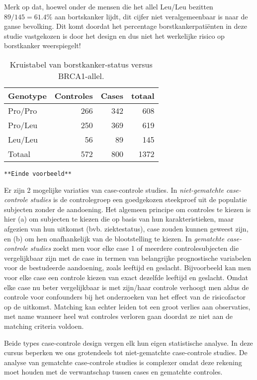 \documentclass[12pt,dutch,coursenotes]{book}
\theoremstyle{definition}
\theoremstyle{definition}
\theoremstyle{definition}
\theoremstyle{remark}
\begin{document}
Merk op dat, hoewel onder de mensen die het allel Leu/Leu bezitten
\(89/145=61.4\%\) aan bortskanker lijdt, dit cijfer niet veralgemeenbaar
is naar de ganse bevolking. Dit komt doordat het percentage
borstkankerpatiënten in deze studie vastgekozen is door het design en
dus niet het werkelijke risico op borstkanker weerspiegelt!

\begin{table}[t]

\caption{\label{tab:leu}Kruistabel van borstkanker-status versus BRCA1-allel.}
\centering
\begin{tabular}{lrrr}
\toprule
Genotype & Controles & Cases & totaal\\
\midrule
Pro/Pro & 266 & 342 & 608\\
Pro/Leu & 250 & 369 & 619\\
Leu/Leu & 56 & 89 & 145\\
Totaal & 572 & 800 & 1372\\
\bottomrule
\end{tabular}
\end{table}

\texttt{**Einde\ voorbeeld**}

Er zijn 2 mogelijke variaties van case-controle studies. In
\emph{niet-gematchte case-controle studies} is de controlegroep een
goedgekozen steekproef uit de populatie subjecten zonder de aandoening.
Het algemeen principe om controles te kiezen is hier (a) om subjecten te
kiezen die op basis van hun karakteristieken, maar afgezien van hun
uitkomst (bvb. ziektestatus), case zouden kunnen geweest zijn, en (b) om
hen onafhankelijk van de blootstelling te kiezen. In \emph{gematchte
case-controle studies} zoekt men voor elke case 1 of meerdere
controlesubjecten die vergelijkbaar zijn met de case in termen van
belangrijke prognostische variabelen voor de bestudeerde aandoening,
zoals leeftijd en geslacht. Bijvoorbeeld kan men voor elke case een
controle kiezen van exact dezelfde leeftijd en geslacht. Omdat elke case
nu beter vergelijkbaar is met zijn/haar controle verhoogt men aldus de
controle voor confounders bij het onderzoeken van het effect van de
risicofactor op de uitkomst. Matching kan echter leiden tot een groot
verlies aan observaties, met name wanneer heel wat controles verloren
gaan doordat ze niet aan de matching criteria voldoen.

Beide types case-controle design vergen elk hun eigen statistische
analyse. In deze cursus beperken we ons grotendeels tot niet-gematchte
case-controle studies. De analyse van gematchte case-controle studies is
complexer omdat deze rekening moet houden met de verwantschap tussen
cases en gematchte controles.
\end{document}
